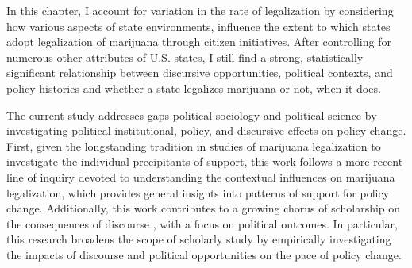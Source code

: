 In this chapter, I account for variation in the rate of legalization by considering how various aspects of state environments, influence the extent to which states adopt legalization of marijuana through citizen initiatives. After controlling for numerous other attributes of U.S. states, I still find a strong, statistically significant relationship between discursive opportunities, political contexts, and policy histories and whether a state legalizes marijuana or not, when it does. 

The current study addresses gaps political sociology and political science by investigating  political institutional, policy, and discursive effects on policy change. First, given the longstanding tradition in studies of marijuana legalization to investigate the individual precipitants of support, this work follows a more recent line of inquiry devoted to understanding the contextual influences on marijuana legalization, which provides general insights into patterns of support for policy change. Additionally, this work contributes to a growing chorus of scholarship on the consequences of discourse \citep{bail_2012,vasi_et_al_2015}, with a focus on political outcomes. In particular, this research broadens the scope of scholarly study by empirically investigating the impacts of discourse and political opportunities on the pace of policy change. 




%
%





